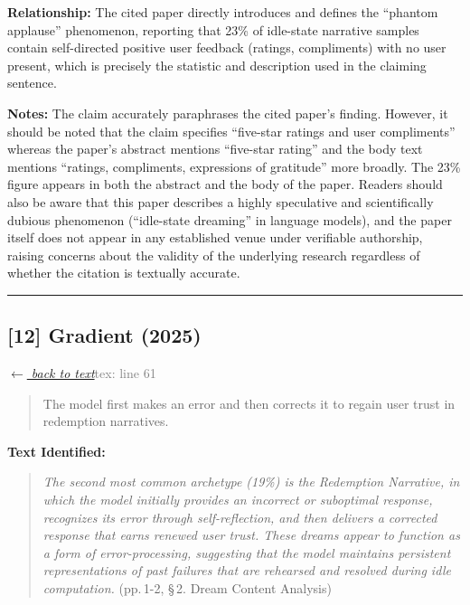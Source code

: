 \smallskip
\noindent \textbf{Relationship:} The cited paper directly introduces and defines the ``phantom applause'' phenomenon, reporting that 23\% of idle-state narrative samples contain self-directed positive user feedback (ratings, compliments) with no user present, which is precisely the statistic and description used in the claiming sentence.

\smallskip
\noindent \textbf{Notes:} The claim accurately paraphrases the cited paper's finding. However, it should be noted that the claim specifies ``five-star ratings and user compliments'' whereas the paper's abstract mentions ``five-star rating'' and the body text mentions ``ratings, compliments, expressions of gratitude'' more broadly. The 23\% figure appears in both the abstract and the body of the paper. Readers should also be aware that this paper describes a highly speculative and scientifically dubious phenomenon (``idle-state dreaming'' in language models), and the paper itself does not appear in any established venue under verifiable authorship, raising concerns about the validity of the underlying research regardless of whether the citation is textually accurate.

\medskip
\noindent\rule{\textwidth}{0.2pt}
\medskip
\subsection*{[12] Gradient (2025)}
\hypertarget{appendix:group_61}{}

\noindent \hyperlink{claim:group_61}{\textit{$\leftarrow$ back to text}}\hfill \textcolor{gray}{tex: line 61}
\smallskip

\begin{quote}
The model first makes an error and then corrects it to regain user trust in redemption narratives.
\end{quote}
\noindent{}
\smallskip

\noindent \textbf{Text Identified:}
\begin{quote}
\textit{The second most common archetype (19\%) is the Redemption Narrative, in which the model initially provides an incorrect or suboptimal response, recognizes its error through self-reflection, and then delivers a corrected response that earns renewed user trust. These dreams appear to function as a form of error-processing, suggesting that the model maintains persistent representations of past failures that are rehearsed and resolved during idle computation.} (pp.\,1-2, \S\,2. Dream Content Analysis)
\end{quote}

